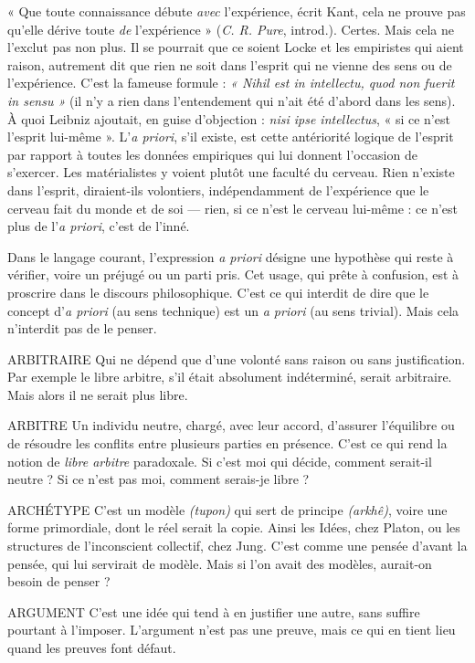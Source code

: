 « Que toute connaissance débute {\it avec} l'expérience, écrit Kant, cela ne
prouve pas qu’elle dérive toute {\it de} l’expérience » ({\it C. R. Pure}, introd.). Certes.
Mais cela ne l’exclut pas non plus. Il se pourrait que ce soient Locke et les
empiristes qui aient raison, autrement dit que rien ne soit dans l'esprit qui
ne vienne des sens ou de l’expérience. C’est la fameuse formule : {\it « Nihil est
in intellectu, quod non fuerit in sensu »} (il n’y a rien dans l’entendement qui
n'ait été d’abord dans les sens). À quoi Leibniz ajoutait, en guise d’objection :
{\it nisi ipse intellectus}, « si ce n’est l'esprit lui-même ». L’{\it a priori}, s’il
existe, est cette antériorité logique de l'esprit par rapport à toutes les données
empiriques qui lui donnent l’occasion de s'exercer. Les matérialistes y
voient plutôt une faculté du cerveau. Rien n’existe dans l'esprit, diraient-ils
volontiers, indépendamment de l’expérience que le cerveau fait du monde et
de soi — rien, si ce n’est le cerveau lui-même : ce n’est plus de l’{\it a priori}, c’est
de l’inné.

Dans le langage courant, l'expression {\it a priori} désigne une hypothèse qui
reste à vérifier, voire un préjugé ou un parti pris. Cet usage, qui prête à confusion,
est à proscrire dans le discours philosophique. C’est ce qui interdit de dire
que le concept d’{\it a priori} (au sens technique) est un {\it a priori} (au sens trivial).
Mais cela n’interdit pas de le penser.

ARBITRAIRE Qui ne dépend que d’une volonté sans raison ou sans justification.
Par exemple le libre arbitre, s’il était absolument
indéterminé, serait arbitraire. Mais alors il ne serait plus libre.

ARBITRE Un individu neutre, chargé, avec leur accord, d’assurer l'équilibre
ou de résoudre les conflits entre plusieurs parties en présence.
C’est ce qui rend la notion de {\it libre arbitre} paradoxale. Si c’est moi qui décide,
comment serait-il neutre ? Si ce n’est pas moi, comment serais-je libre ?

ARCHÉTYPE C’est un modèle {\it (tupon)} qui sert de principe {\it (arkhê)}, voire
une forme primordiale, dont le réel serait la copie. Ainsi les
Idées, chez Platon, ou les structures de l'inconscient collectif, chez Jung. C’est
comme une pensée d’avant la pensée, qui lui servirait de modèle. Mais si l’on
avait des modèles, aurait-on besoin de penser ?

ARGUMENT C’est une idée qui tend à en justifier une autre, sans suffire
pourtant à l’imposer. L’argument n’est pas une preuve, mais
ce qui en tient lieu quand les preuves font défaut.

